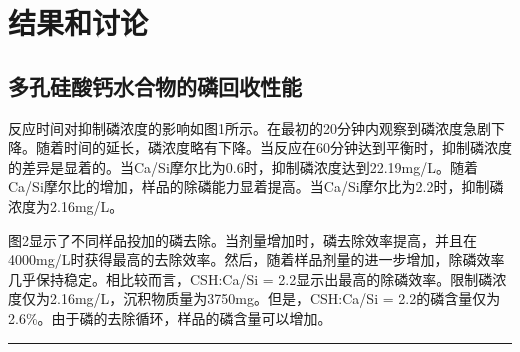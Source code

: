 \documentclass[11pt]{article}
\begin{document}
\section{结果和讨论}
\label{sec:orgda4daff}
\subsection{多孔硅酸钙水合物的磷回收性能}
\label{sec:orgf951b0a}
\setlength{\parindent}{1.0cm}
反应时间对抑制磷浓度的影响如图1所示。在最初的20分钟内观察到磷浓度急剧下降。随着时间的延长，磷浓度略有下降。当反应在60分钟达到平衡时，抑制磷浓度的差异是显着的。当Ca/Si摩尔比为0.6时，抑制磷浓度达到22.19mg/L。随着Ca/Si摩尔比的增加，样品的除磷能力显着提高。当Ca/Si摩尔比为2.2时，抑制磷浓度为2.16mg/L。
\par

\setlength{\parindent}{1.0cm}
图2显示了不同样品投加的磷去除。当剂量增加时，磷去除效率提高，并且在4000mg/L时获得最高的去除效率。然后，随着样品剂量的进一步增加，除磷效率几乎保持稳定。相比较而言，CSH:Ca/Si = 2.2显示出最高的除磷效率。限制磷浓度仅为2.16mg/L，沉积物质量为3750mg。但是，CSH:Ca/Si = 2.2的磷含量仅为2.6\%。由于磷的去除循环，样品的磷含量可以增加。
\par


\noindent\rule{\textwidth}{0.5pt}
\end{document}
